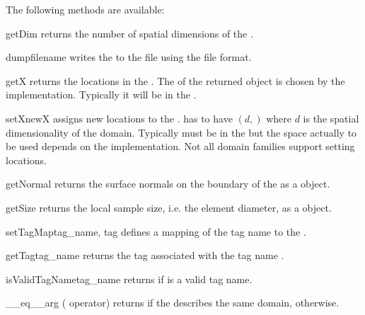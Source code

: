 \vspace{1em}\noindent The following methods are available:
\begin{methoddesc}[Domain]{getDim}{}
    returns the number of spatial dimensions of the \Domain.
\end{methoddesc}
%
\begin{methoddesc}[Domain]{dump}{filename}
    writes the \Domain to the file  using the \netCDF file format.
\end{methoddesc}
%
\begin{methoddesc}[Domain]{getX}{}
    returns the locations in the \Domain. The \FunctionSpace of the returned
    \Data object is chosen by the \Domain implementation. Typically it will be
    in the \ContinuousFunction.
\end{methoddesc}
%
\begin{methoddesc}[Domain]{setX}{newX}
    assigns new locations to the \Domain.  has to have \Shape $(d,)$
    where $d$ is the spatial dimensionality of the domain. Typically 
    must be in the \ContinuousFunction but the space actually to be used
    depends on the \Domain implementation. Not all domain families support
    setting locations.
\end{methoddesc}
%
\begin{methoddesc}[Domain]{getNormal}{}
    returns the surface normals on the boundary of the \Domain as a \Data object.
\end{methoddesc}
%
\begin{methoddesc}[Domain]{getSize}{}
    returns the local sample size, i.e. the element diameter, as a \Data object.
\end{methoddesc}
%
\begin{methoddesc}[Domain]{setTagMap}{tag_name, tag}
    defines a mapping of the tag name  to the .
\end{methoddesc}
%
\begin{methoddesc}[Domain]{getTag}{tag_name}
    returns the tag associated with the tag name .
\end{methoddesc}
%
\begin{methoddesc}[Domain]{isValidTagName}{tag_name}
    returns \True if  is a valid tag name.
\end{methoddesc}
%
\begin{methoddesc}[Domain]{__eq__}{arg}
    (\PYTHON \var{==} operator) returns \True if the \Domain {}
    describes the same domain, \False otherwise.
\end{methoddesc}

